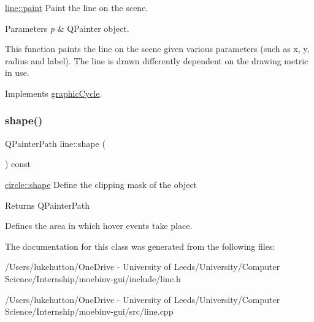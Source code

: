 \mbox{\hyperlink{classline_a5607ea98a22c8625342ad71d17043e1b}{line\+::paint}} Paint the line on the scene. 


\begin{DoxyParams}{Parameters}
{\em p} & Q\+Painter object.\\
\hline
\end{DoxyParams}
This function paints the line on the scene given various parameters (such as x, y, radius and label). The line is drawn differently dependent on the drawing metric in use. 

Implements \mbox{\hyperlink{classgraphic_cycle}{graphic\+Cycle}}.

\mbox{\label{classline_ae9aabb8694d14d941d21843dc0a52811}} 
\subsubsection{\texorpdfstring{shape()}{shape()}}
{\footnotesize\ttfamily Q\+Painter\+Path line\+::shape (\begin{DoxyParamCaption}{ }\end{DoxyParamCaption}) const\hspace{0.3cm}{\ttfamily [override]}}



\mbox{\hyperlink{classcircle_a198cbcea745bd311fe91c2a23def746c}{circle\+::shape}} Define the clipping mask of the object 

\begin{DoxyReturn}{Returns}
Q\+Painter\+Path
\end{DoxyReturn}
Defines the area in which hover events take place. 

The documentation for this class was generated from the following files\+:\begin{DoxyCompactItemize}
\item 
/\+Users/lukehutton/\+One\+Drive -\/ University of Leeds/\+University/\+Computer Science/\+Internship/moebinv-\/gui/include/line.\+h\item 
/\+Users/lukehutton/\+One\+Drive -\/ University of Leeds/\+University/\+Computer Science/\+Internship/moebinv-\/gui/src/line.\+cpp\end{DoxyCompactItemize}
